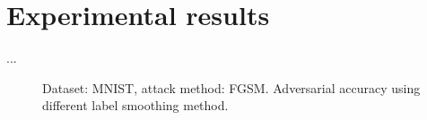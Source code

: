 \section{Experimental results}
...

\begin{figure}[!htp]%
    \centering
    \quad
    \caption{Dataset: MNIST, attack method: FGSM. Adversarial accuracy using different label smoothing method.}%
    \label{fig:example}%
\end{figure}